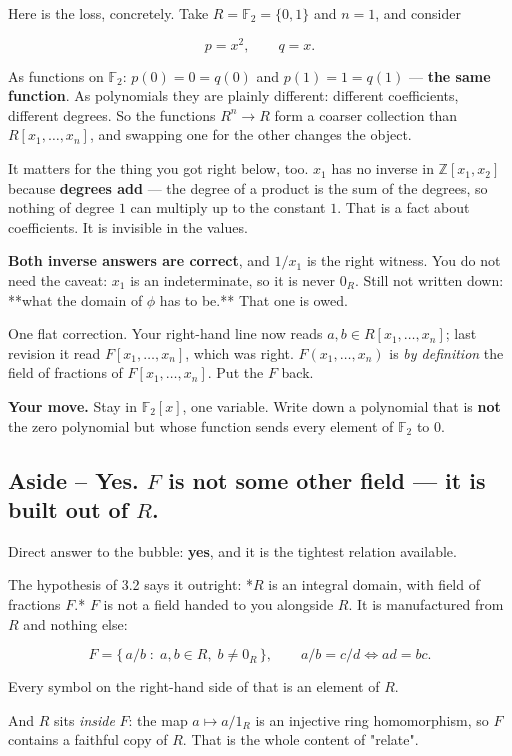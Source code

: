 \documentclass[11pt]{article}
\begin{document}
Here is the loss, concretely. Take $R = \mathbb{F}_2 = \{0,1\}$ and $n = 1$, and consider

$$p = x^2, \qquad q = x.$$

As functions on $\mathbb{F}_2$: $p(0) = 0 = q(0)$ and $p(1) = 1 = q(1)$ --- \textbf{the same function}. As polynomials they are plainly different: different coefficients, different degrees. So the functions $R^n \to R$ form a coarser collection than $R[x_1,\ldots,x_n]$, and swapping one for the other changes the object.

It matters for the thing you got right below, too. $x_1$ has no inverse in $\mathbb{Z}[x_1,x_2]$ because \textbf{degrees add} --- the degree of a product is the sum of the degrees, so nothing of degree $1$ can multiply up to the constant $1$. That is a fact about coefficients. It is invisible in the values.

\textbf{Both inverse answers are correct}, and $1/x_1$ is the right witness. You do not need the caveat: $x_1$ is an indeterminate, so it is never $0_R$. Still not written down: **what the domain of $\phi$ has to be.** That one is owed.

One flat correction. Your right-hand line now reads $a, b \in R[x_1,\ldots,x_n]$; last revision it read $F[x_1,\ldots,x_n]$, which was right. $F(x_1,\ldots,x_n)$ is \emph{by definition} the field of fractions of $F[x_1,\ldots,x_n]$. Put the $F$ back.

\textbf{Your move.} Stay in $\mathbb{F}_2[x]$, one variable. Write down a polynomial that is \textbf{not} the zero polynomial but whose function sends every element of $\mathbb{F}_2$ to $0$.


\subsection*{Aside -- Yes. $F$ is not some other field --- it is built out of $R$.}
Direct answer to the bubble: \textbf{yes}, and it is the tightest relation available.

The hypothesis of 3.2 says it outright: *$R$ is an integral domain, with field of fractions $F$.* $F$ is not a field handed to you alongside $R$. It is manufactured from $R$ and nothing else:

$$F = \{\, a/b \;:\; a,b \in R,\; b \neq 0_R \,\}, \qquad a/b = c/d \iff ad = bc.$$

Every symbol on the right-hand side of that is an element of $R$.

And $R$ sits \emph{inside} $F$: the map $a \mapsto a/1_R$ is an injective ring homomorphism, so $F$ contains a faithful copy of $R$. That is the whole content of "relate".
\end{document}
